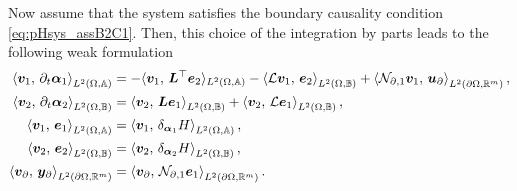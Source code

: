 Now assume that the system satisfies the boundary causality condition \ref{eq:pHsys_assB2C1}. Then, this choice of the integration by parts leads to the following weak formulation
\begin{equation}\label{eq:weak_sys_intJ1}
\begin{aligned}
\inner[L^2(\Omega, \mathbb{A})]{\bm{v}_1}{\partial_t \bm{\alpha}_1} &=   -  \langle{\bm{v}_1}, \,{\bm{L}^\top \bm{e}_2}\rangle_{L^2(\Omega, \mathbb{A})}  -\inner[L^2(\Omega, \mathbb{B})]{\mathcal{L}\bm{v}_1}{\bm{e}_2} + \inner[L^2(\partial \Omega, \mathbb{R}^m)]{\mathcal{N}_{\partial, 1} \bm{v}_1}{\bm{u}_\partial}, \\
\inner[L^2(\Omega, \mathbb{B})]{\bm{v}_2}{\partial_t \bm{\alpha}_2} &=   \inner[L^2(\Omega, \mathbb{B})]{\bm{v}_2}{\bm{L}\bm{e}_1} + \inner[L^2(\Omega, \mathbb{B})]{\bm{v}_2}{\mathcal{L}\bm{e}_1}, \\
\inner[L^2(\Omega, \mathbb{A})]{\bm{v}_1}{\bm{e}_1}&= \inner[L^2(\Omega, \mathbb{A})]{\bm{v}_1}{\delta_{\bm{\alpha}_1} H}, \\
\inner[L^2(\Omega, \mathbb{B})]{\bm{v}_2}{\bm{e}_2}&= \inner[L^2(\Omega, \mathbb{B})]{\bm{v}_2}{\delta_{\bm{\alpha}_2} H}, \\
\inner[L^2(\partial \Omega, \mathbb{R}^m)]{\bm{v}_\partial}{\bm{y}_\partial} &= \inner[L^2(\partial \Omega, \mathbb{R}^m)]{\bm{v}_\partial}{\mathcal{N}_{\partial, 1}\bm{e}_1}.
\end{aligned}
\end{equation}

